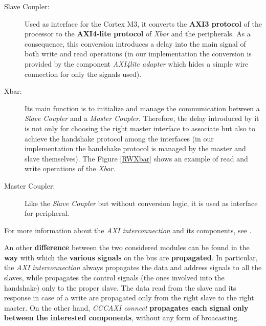 {\flushleft
\begin{description}

\item[Slave Coupler:]Used as interface for the Cortex M3, it converts the \textbf{AXI3 protocol} of the processor to the \textbf{AXI4-lite protocol} of \textit{Xbar} and the peripherals. As a consequence, this conversion introduces a delay into the main signal of both write and read operations (in our implementation the conversion is provided by the component \textit{AXI4lite adapter} which hides a simple wire connection for only the signals used).

\item[Xbar:]Its main function is to initialize and manage the communication between a \textit{Slave Coupler} and a \textit{Master Coupler}. Therefore, the delay introduced by it is not only for choosing the right master interface to associate but also to achieve the handshake protocol among the interfaces (in our implementation the handshake protocol is managed by the master and slave themselves).
The Figure \ref{RWXbar} shows an example of read and write operations of the \textit{Xbar}.

\item[Master Coupler:]Like the \textit{Slave Coupler} but without conversion logic, it is used as interface for peripheral.

\end{description}
}

For more information about the \textit{AXI interconnection} and its components, see \cite{AXIInterconnectGuide}.
\newline



{}

An other {\bf difference} between the two considered modules can be found in the {\bf way} with which the {\bf various signals} on the bus are {\bf propagated}. In particular, the \textit{AXI interconnection} always propagates the data and address signals to all the slaves, while propagates the control signals (the ones involved into the handshake) only to the proper slave. The data read from the slave and its response in case of a write are propagated only from the right slave to the right master. On the other hand, \textit{CCCAXI connect} {\bf propagates each signal only between the interested components}, without any form of broacasting.
\newline

